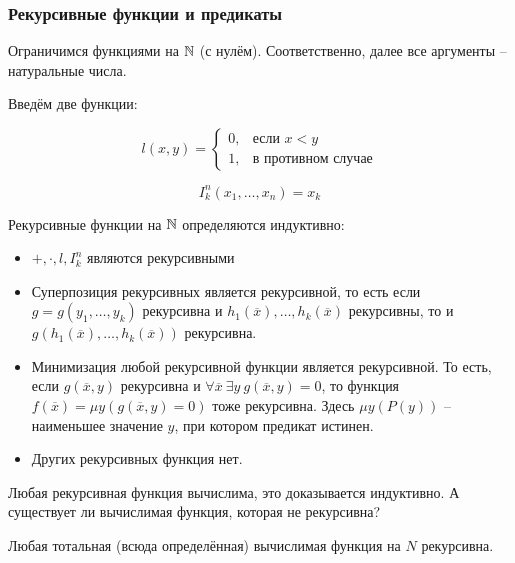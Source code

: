 
\subsubsection{Рекурсивные функции и предикаты}

Ограничимся функциями на ${\mathbb N}$ (с нулём). Соответственно, далее все аргументы -- натуральные числа.

Введём две функции:

\[
    l(x, y) = \begin{cases}0, & \text{если $x<y$}\\ 1, &\text{в противном случае}\end{cases}
\]

\[
    I^n_k(x_1, \ldots, x_n) = x_k 
\]

\begin{definition}
    Рекурсивные функции на ${\mathbb N}$ определяются индуктивно:
    \begin{itemize}
        \item $+, \cdot, l, I_k^n$ являются рекурсивными
        \item Суперпозиция рекурсивных является рекурсивной, то есть если $g = g(y_1, \ldots, y_k)$ рекурсивна и $h_1(\overline{x}), \ldots, h_k(\overline{x})$ рекурсивны, то и $g(h_1(\overline{x}), \ldots, h_k(\overline{x}))$ рекурсивна.
        \item Минимизация любой рекурсивной функции является рекурсивной. То есть, если $g(\overline{x}, y)$ рекурсивна и $\forall \overline{x}~\exists y~g(\overline{x}, y)=0$, то функция $f(\overline{x})=\mu y(g(\overline{x}, y)=0)$ тоже рекурсивна. Здесь $\mu y(P(y))$ -- наименьшее значение $y$, при котором предикат истинен.
        \item Других рекурсивных функция нет.
    \end{itemize}
\end{definition}

\begin{remark}
    Любая рекурсивная функция вычислима, это доказывается индуктивно. А существует ли вычислимая функция, которая не рекурсивна?
\end{remark}

\begin{conjecture}
    Любая тотальная (всюда определённая) вычислимая функция на $N$ рекурсивна.
\end{conjecture}

